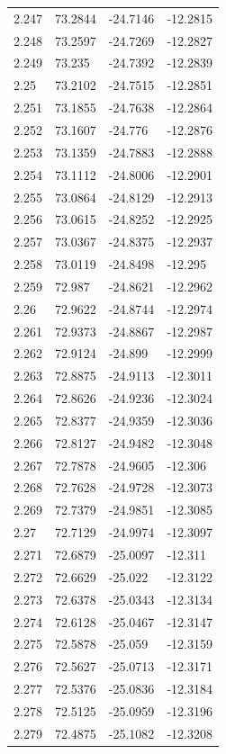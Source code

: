 \begin{tabular}{llll}
2.247 & 73.2844 & -24.7146 & -12.2815 \\
2.248 & 73.2597 & -24.7269 & -12.2827 \\
2.249 & 73.235 & -24.7392 & -12.2839 \\
2.25 & 73.2102 & -24.7515 & -12.2851 \\
2.251 & 73.1855 & -24.7638 & -12.2864 \\
2.252 & 73.1607 & -24.776 & -12.2876 \\
2.253 & 73.1359 & -24.7883 & -12.2888 \\
2.254 & 73.1112 & -24.8006 & -12.2901 \\
2.255 & 73.0864 & -24.8129 & -12.2913 \\
2.256 & 73.0615 & -24.8252 & -12.2925 \\
2.257 & 73.0367 & -24.8375 & -12.2937 \\
2.258 & 73.0119 & -24.8498 & -12.295 \\
2.259 & 72.987 & -24.8621 & -12.2962 \\
2.26 & 72.9622 & -24.8744 & -12.2974 \\
2.261 & 72.9373 & -24.8867 & -12.2987 \\
2.262 & 72.9124 & -24.899 & -12.2999 \\
2.263 & 72.8875 & -24.9113 & -12.3011 \\
2.264 & 72.8626 & -24.9236 & -12.3024 \\
2.265 & 72.8377 & -24.9359 & -12.3036 \\
2.266 & 72.8127 & -24.9482 & -12.3048 \\
2.267 & 72.7878 & -24.9605 & -12.306 \\
2.268 & 72.7628 & -24.9728 & -12.3073 \\
2.269 & 72.7379 & -24.9851 & -12.3085 \\
2.27 & 72.7129 & -24.9974 & -12.3097 \\
2.271 & 72.6879 & -25.0097 & -12.311 \\
2.272 & 72.6629 & -25.022 & -12.3122 \\
2.273 & 72.6378 & -25.0343 & -12.3134 \\
2.274 & 72.6128 & -25.0467 & -12.3147 \\
2.275 & 72.5878 & -25.059 & -12.3159 \\
2.276 & 72.5627 & -25.0713 & -12.3171 \\
2.277 & 72.5376 & -25.0836 & -12.3184 \\
2.278 & 72.5125 & -25.0959 & -12.3196 \\
2.279 & 72.4875 & -25.1082 & -12.3208 \\

\end{tabular}

